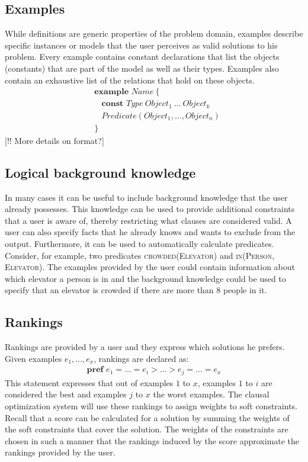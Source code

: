 \subsection{Examples}
While definitions are generic properties of the problem domain, examples describe specific instances or models that the user perceives as valid solutions to his problem.
Every example contains constant declarations that list the objects (constants) that are part of the model as well as their types.
Examples also contain an exhaustive list of the relations that hold on these objects.
\begin{align*}
&\textbf{example } Name\  \{\\
&\  \  \  \  \textbf{const } Type\  Object_1\  ...\  Object_k\\
&\  \  \  \  Predicate(Object_1, ..., Object_n)\\
&\}
\end{align*}
[!! More details on format?]

\subsection{Logical background knowledge}
In many cases it can be useful to include background knowledge that the user already possesses.
This knowledge can be used to provide additional constraints that a user is aware of, thereby restricting what clauses are considered valid.
A user can also specify facts that he already knows and wants to exclude from the output.
Furthermore, it can be used to automatically calculate predicates.
Consider, for example, two predicates \textsc{crowded(Elevator)} and \textsc{in(Person, Elevator)}.
The examples provided by the user could contain information about which elevator a person is in and the background knowledge could be used to specify that an elevator is crowded if there are more than 8 people in it.

\subsection{Rankings}
Rankings are provided by a user and they express which solutions he prefers.
Given examples $e_1, ..., e_x$, rankings are declared as:
\begin{align*}
\textbf{pref } e_1 = ... = e_i > ... > e_j = ... = e_x
\end{align*}
This statement expresses that out of examples $1$ to $x$, examples $1$ to $i$ are considered the best and examples $j$ to $x$ the worst examples.
The clausal optimization system will use these rankings to assign weights to soft constraints.
Recall that a score can be calculated for a solution by summing the weights of the soft constraints that cover the solution.
The weights of the constraints are chosen in such a manner that the rankings induced by the score approximate the rankings provided by the user.


